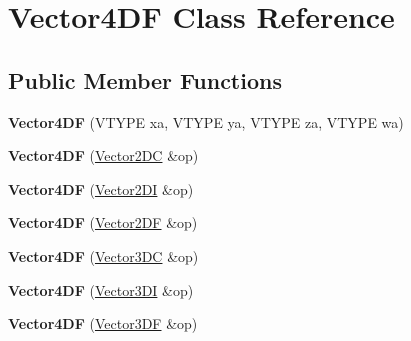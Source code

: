 \hypertarget{class_vector4_d_f}{\section{Vector4\+D\+F Class Reference}
\label{class_vector4_d_f}
}
\subsection*{Public Member Functions}
\begin{DoxyCompactItemize}
\item 
\hypertarget{class_vector4_d_f_a4361d4ce57043a0afd58e143f6691a71}{{\bfseries Vector4\+D\+F} (V\+T\+Y\+P\+E xa, V\+T\+Y\+P\+E ya, V\+T\+Y\+P\+E za, V\+T\+Y\+P\+E wa)}\label{class_vector4_d_f_a4361d4ce57043a0afd58e143f6691a71}

\item 
\hypertarget{class_vector4_d_f_a132782a7b7788dca3d74a5ec070c56c1}{{\bfseries Vector4\+D\+F} (\hyperlink{class_vector2_d_c}{Vector2\+D\+C} \&op)}\label{class_vector4_d_f_a132782a7b7788dca3d74a5ec070c56c1}

\item 
\hypertarget{class_vector4_d_f_a6011685ae78b517752b4b69a85a2e0fa}{{\bfseries Vector4\+D\+F} (\hyperlink{class_vector2_d_i}{Vector2\+D\+I} \&op)}\label{class_vector4_d_f_a6011685ae78b517752b4b69a85a2e0fa}

\item 
\hypertarget{class_vector4_d_f_a0d367c9b78daf44b2925585cc1dbea7a}{{\bfseries Vector4\+D\+F} (\hyperlink{class_vector2_d_f}{Vector2\+D\+F} \&op)}\label{class_vector4_d_f_a0d367c9b78daf44b2925585cc1dbea7a}

\item 
\hypertarget{class_vector4_d_f_a90e80cd38136721984588c9f20504c37}{{\bfseries Vector4\+D\+F} (\hyperlink{class_vector3_d_c}{Vector3\+D\+C} \&op)}\label{class_vector4_d_f_a90e80cd38136721984588c9f20504c37}

\item 
\hypertarget{class_vector4_d_f_a79c74b4aa7671d4433774d25d80ff754}{{\bfseries Vector4\+D\+F} (\hyperlink{class_vector3_d_i}{Vector3\+D\+I} \&op)}\label{class_vector4_d_f_a79c74b4aa7671d4433774d25d80ff754}

\item 
\hypertarget{class_vector4_d_f_a8bb5262e151ee8539953ac8ced8372fb}{{\bfseries Vector4\+D\+F} (\hyperlink{class_vector3_d_f}{Vector3\+D\+F} \&op)}\label{class_vector4_d_f_a8bb5262e151ee8539953ac8ced8372fb}


\end{DoxyCompactItemize}
